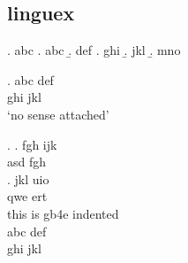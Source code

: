 \subsection{linguex}

\Lsciex. abc
\a.  abc
\b. def
  \a. ghi
  \b. jkl
  \b. mno
  

\Lsciex. 
\gll abc def\\
ghi jkl\\
\glt `no sense attached'

 
\Lsciex. 
\ag. fgh ijk\\
     asd fgh\\
\bg. jkl uio\\
     qwe ert\\
     
     
     
\ea this is gb4e
 \ea indented\\
 	\gll abc def\\
         ghi jkl\\
  \z
\z  
     